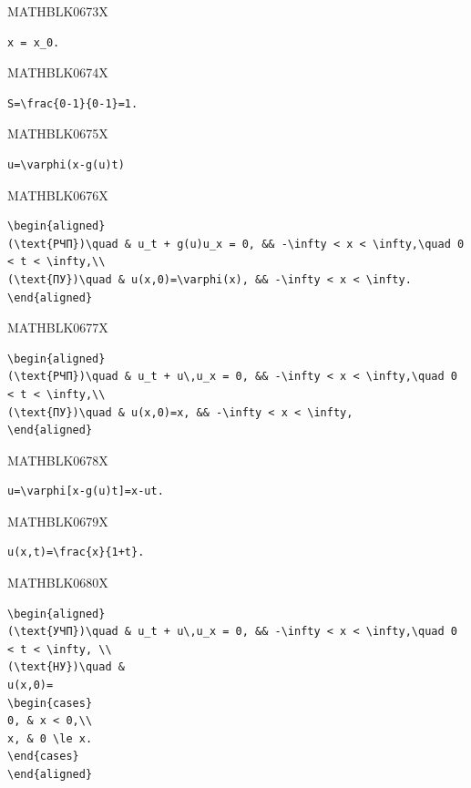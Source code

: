 \documentclass[
  ukrainian,
]{article}
\begin{document}
MATHBLK0673X

\begin{verbatim}
x = x_0.
\end{verbatim}

MATHBLK0674X

\begin{verbatim}
S=\frac{0-1}{0-1}=1.
\end{verbatim}

MATHBLK0675X

\begin{verbatim}
u=\varphi(x-g(u)t)
\end{verbatim}

MATHBLK0676X

\begin{verbatim}
\begin{aligned}
(\text{РЧП})\quad & u_t + g(u)u_x = 0, && -\infty < x < \infty,\quad 0 < t < \infty,\\
(\text{ПУ})\quad & u(x,0)=\varphi(x), && -\infty < x < \infty.
\end{aligned}
\end{verbatim}

MATHBLK0677X

\begin{verbatim}
\begin{aligned}
(\text{РЧП})\quad & u_t + u\,u_x = 0, && -\infty < x < \infty,\quad 0 < t < \infty,\\
(\text{ПУ})\quad & u(x,0)=x, && -\infty < x < \infty,
\end{aligned}
\end{verbatim}

MATHBLK0678X

\begin{verbatim}
u=\varphi[x-g(u)t]=x-ut.
\end{verbatim}

MATHBLK0679X

\begin{verbatim}
u(x,t)=\frac{x}{1+t}.
\end{verbatim}

MATHBLK0680X

\begin{verbatim}
\begin{aligned}
(\text{УЧП})\quad & u_t + u\,u_x = 0, && -\infty < x < \infty,\quad 0 < t < \infty, \\
(\text{НУ})\quad &
u(x,0)=
\begin{cases}
0, & x < 0,\\
x, & 0 \le x.
\end{cases}
\end{aligned}
\end{verbatim}
\end{document}
